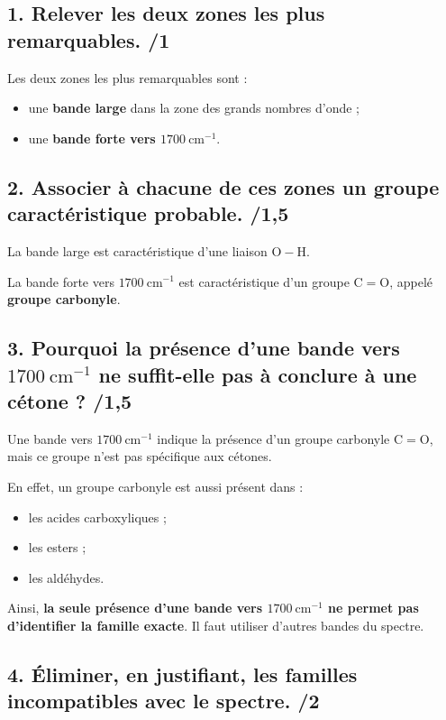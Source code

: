 \documentclass[11pt,a4paper]{article}
\begin{document}
\subsection*{1. Relever les deux zones les plus remarquables. \hfill /1}

Les deux zones les plus remarquables sont :
\begin{itemize}
    \item une \textbf{bande large} dans la zone des grands nombres d'onde ;
    \item une \textbf{bande forte vers \(1700\ \mathrm{cm}^{-1}\)}.
\end{itemize}

\subsection*{2. Associer à chacune de ces zones un groupe caractéristique probable. \hfill /1{,}5}

La bande large est caractéristique d'une liaison \(\mathrm{O-H}\).

La bande forte vers \(1700\ \mathrm{cm}^{-1}\) est caractéristique d'un groupe \(\mathrm{C=O}\), appelé \textbf{groupe carbonyle}.

\subsection*{3. Pourquoi la présence d'une bande vers \(1700\ \mathrm{cm}^{-1}\) ne suffit-elle pas à conclure à une cétone ? \hfill /1{,}5}

Une bande vers \(1700\ \mathrm{cm}^{-1}\) indique la présence d'un groupe carbonyle \(\mathrm{C=O}\), mais ce groupe n'est pas spécifique aux cétones.

En effet, un groupe carbonyle est aussi présent dans :
\begin{itemize}
    \item les acides carboxyliques ;
    \item les esters ;
    \item les aldéhydes.
\end{itemize}

Ainsi, \textbf{la seule présence d'une bande vers \(1700\ \mathrm{cm}^{-1}\) ne permet pas d'identifier la famille exacte}. Il faut utiliser d'autres bandes du spectre.

\subsection*{4. Éliminer, en justifiant, les familles incompatibles avec le spectre. \hfill /2}
\end{document}
